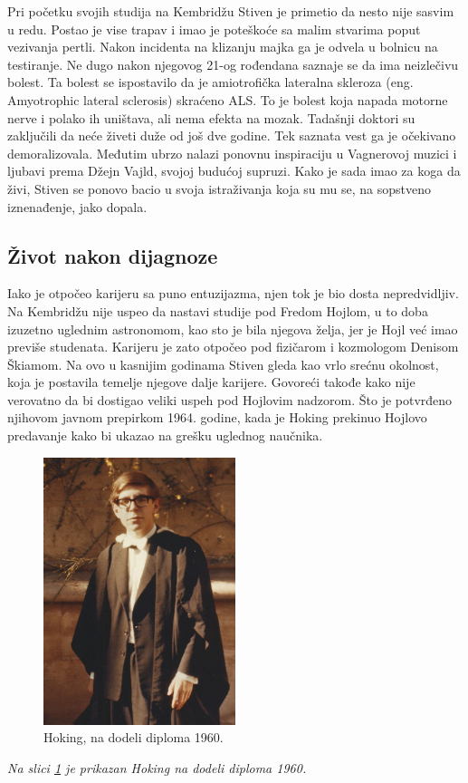 \documentclass[a4paper, 12pt]{article}
\begin{document}
{Pri početku svojih studija na Kembridžu Stiven je primetio da nesto nije sasvim u 
redu. Postao je vise trapav i imao je poteškoće sa malim stvarima poput vezivanja 
pertli. Nakon incidenta na klizanju majka ga je odvela u bolnicu na testiranje. Ne 
dugo nakon njegovog 21-og rođendana saznaje se da ima neizlečivu bolest. Ta bolest 
se ispostavilo da je amiotrofička lateralna skleroza (eng. Amyotrophic lateral 
sclerosis) skraćeno ALS. To je bolest koja napada motorne nerve i polako ih uništava, 
ali nema efekta na mozak. Tadašnji doktori su zaključili da neće živeti duže od još 
dve godine. Tek saznata vest ga je očekivano demoralizovala. Međutim ubrzo nalazi ponovnu 
inspiraciju u Vagnerovoj muzici i ljubavi prema Džejn Vajld, svojoj budućoj supruzi. 
Kako je sada imao za koga da živi, Stiven se ponovo bacio u svoja istraživanja koja 
su mu se, na sopstveno iznenađenje, jako dopala. \cite{hawkingcom}

\subsection{Život nakon dijagnoze}
Iako je otpočeo karijeru sa puno entuzijazma, njen tok je bio dosta nepredvidljiv. 
Na Kembridžu nije uspeo da nastavi studije pod Fredom Hojlom, u to doba izuzetno 
uglednim astronomom, kao sto je bila njegova želja, jer je Hojl već imao previše 
studenata. Karijeru je zato otpočeo pod fizičarom i kozmologom Denisom Škiamom. 
Na ovo u kasnijim godinama Stiven gleda kao vrlo srećnu okolnost, koja je postavila 
temelje njegove dalje karijere. Govoreći takođe kako nije verovatno da bi dostigao 
veliki uspeh pod Hojlovim nadzorom. Što je potvrđeno njihovom javnom prepirkom 1964. 
godine, kada je Hoking prekinuo Hojlovo predavanje kako bi ukazao na grešku uglednog 
naučnika. \medskip \cite{kratkaistorija}
\newpage

\begin{figure}[h!]
  \centering
  \includegraphics[width=0.5\textwidth]{Hoking,PreDijagnoze.jpg}
  \caption{Hoking, na dodeli diploma 1960.}
  \label{fig:Hoking,PreDijagnoze}
  \end{figure}
  \emph {Na slici \ref{fig:Hoking,PreDijagnoze} je prikazan Hoking na dodeli diploma 1960.}
  \bigskip

}
\end{document}
